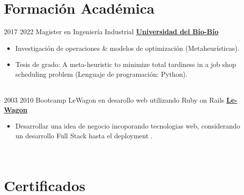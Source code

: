 \documentclass[letterpaper]{DS_class_file} %
\begin{document}
\makeprofile %

\section{Formación Académica}

\begin{twenty} %
   	\twentyitem
	    {2017}
		{2022}
	    {\hspace{0.2cm}Magister en Ingeniería Industrial}
	    {\href{https://magister.industrial.ubiobio.cl/}{\hspace{0.27cm} \textbf{Universidad del Bío-Bío} }}
	    {}
	    {\begin{itemize}
			\item Investigación de operaciones \& modelos de optimización (Metaheurísticas).
			\item Tesis de grado: A meta-heuristic to minimize total tardiness in a job shop scheduling problem (Lenguaje de programación: Python).
		\end{itemize}}
		\\
	   	\twentyitem
			{2003}
			{2010}
			{\hspace{0.2cm}Bootcamp LeWagon en desarollo web utilizando Ruby on Rails}
			{\href{https://www.lewagon.com}{\hspace{0.27cm} \textbf{Le-Wagon} }}
			{}
			{\begin{itemize}
					\item Desarrollar una idea de negocio incoporando tecnologias web,  considerando un desarrollo Full Stack  hasta el deployment .
			\end{itemize}}
			\\
\end{twenty}


\section{Certificados}
\end{document}
